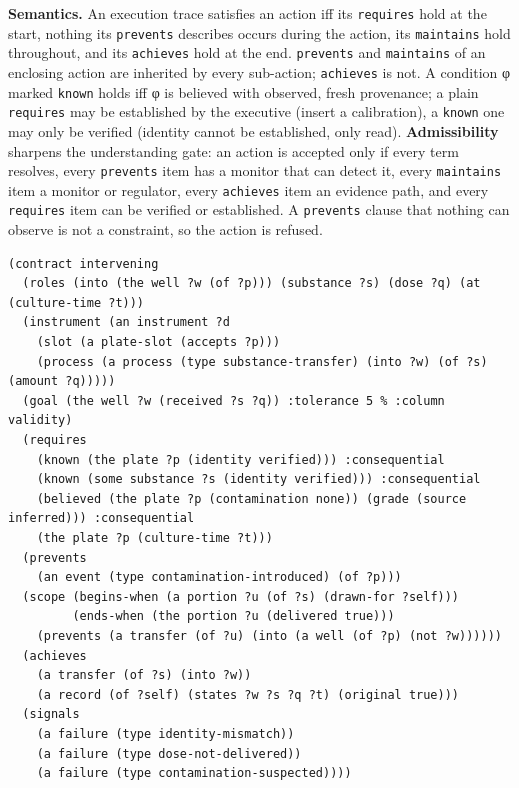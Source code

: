 \documentclass[10pt,a4paper]{article}
\begin{document}
\textbf{Semantics.} An execution trace satisfies an action iff its \texttt{requires} hold at the start, nothing its \texttt{prevents} describes occurs during the action, its \texttt{maintains} hold throughout, and its \texttt{achieves} hold at the end. \texttt{prevents} and \texttt{maintains} of an enclosing action are inherited by every sub-action; \texttt{achieves} is not. A condition φ marked \texttt{known} holds iff φ is believed with observed, fresh provenance; a plain \texttt{requires} may be established by the executive (insert a calibration), a \texttt{known} one may only be verified (identity cannot be established, only read). \textbf{Admissibility} sharpens the understanding gate: an action is accepted only if every term resolves, every \texttt{prevents} item has a monitor that can detect it, every \texttt{maintains} item a monitor or regulator, every \texttt{achieves} item an evidence path, and every \texttt{requires} item can be verified or established. A \texttt{prevents} clause that nothing can observe is not a constraint, so the action is refused.

\begin{listing}[tbp]
\begin{Verbatim}[fontsize=\footnotesize,breaklines,frame=lines,framesep=2mm]
(contract intervening
  (roles (into (the well ?w (of ?p))) (substance ?s) (dose ?q) (at (culture-time ?t)))
  (instrument (an instrument ?d
    (slot (a plate-slot (accepts ?p)))
    (process (a process (type substance-transfer) (into ?w) (of ?s) (amount ?q)))))
  (goal (the well ?w (received ?s ?q)) :tolerance 5 % :column validity)
  (requires
    (known (the plate ?p (identity verified))) :consequential
    (known (some substance ?s (identity verified))) :consequential
    (believed (the plate ?p (contamination none)) (grade (source inferred))) :consequential
    (the plate ?p (culture-time ?t)))
  (prevents
    (an event (type contamination-introduced) (of ?p)))
  (scope (begins-when (a portion ?u (of ?s) (drawn-for ?self)))
         (ends-when (the portion ?u (delivered true)))
    (prevents (a transfer (of ?u) (into (a well (of ?p) (not ?w))))))
  (achieves
    (a transfer (of ?s) (into ?w))
    (a record (of ?self) (states ?w ?s ?q ?t) (original true)))
  (signals
    (a failure (type identity-mismatch))
    (a failure (type dose-not-delivered))
    (a failure (type contamination-suspected))))
\end{Verbatim}
\caption{The contract of the action type \texttt{intervening} (\texttt{registry/lab/contracts.ldl}).}\label{lst:contract}
\end{listing}
\end{document}
